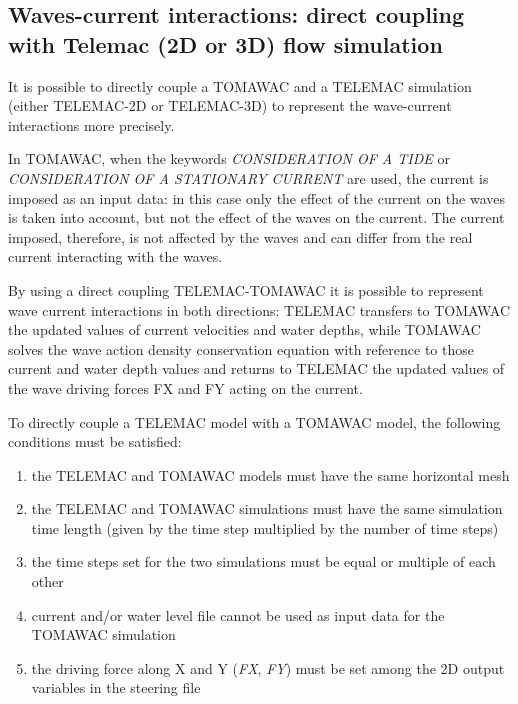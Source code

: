 \subsection{ Waves-current interactions: direct coupling with Telemac (2D or 3D) flow simulation}

 It is possible to directly couple a TOMAWAC and a TELEMAC simulation (either TELEMAC-2D or TELEMAC-3D) to represent the wave-current interactions more precisely.

 In TOMAWAC, when the keywords \textit{CONSIDERATION OF A TIDE} or \textit{CONSIDERATION OF A STATIONARY CURRENT} are used, the current is imposed as an input data: in this case only the effect of the current on the waves is taken into account, but not the effect of the waves on the current. The current imposed, therefore, is not affected by the waves and can differ from the real current interacting with the waves.

 By using a direct coupling TELEMAC-TOMAWAC it is possible to represent wave current interactions in both directions: TELEMAC transfers to TOMAWAC the updated values of current velocities and water depths, while TOMAWAC solves the wave action density conservation equation with reference to those current and water depth values and returns to TELEMAC the updated values of the wave driving forces FX and FY acting on the current.

 To directly couple a TELEMAC model with a TOMAWAC model, the following conditions must be satisfied:

\begin{enumerate}
\item  the TELEMAC and TOMAWAC models must have the same horizontal mesh

\item  the TELEMAC and TOMAWAC simulations must have the same simulation time length (given by the time step multiplied by the number of time steps)

\item  the time steps set for the two simulations must be equal or multiple of each other

\item  current and/or water level file cannot be used as input data for the TOMAWAC simulation

\item  the driving force along X and Y (\textit{FX}, \textit{FY}) must be set among the 2D output variables in the steering file
\end{enumerate}



